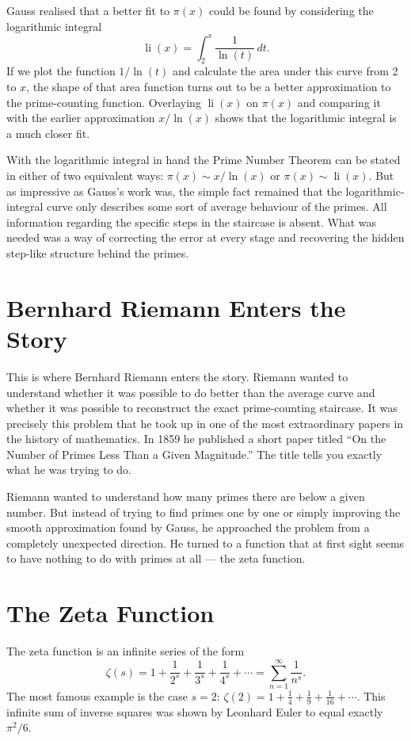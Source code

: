 \documentclass[11pt]{article}
\newcommand{\li}{\operatorname{li}}
\begin{document}
Gauss realised that a better fit to $\pi(x)$ could be found by considering the logarithmic integral
\[
\li(x) = \int_{2}^{x} \frac{1}{\ln(t)}\, dt.
\]
If we plot the function $1/\ln(t)$ and calculate the area under this curve from 2 to $x$, the shape of that area function turns out to be a better approximation to the prime-counting function. Overlaying $\li(x)$ on $\pi(x)$ and comparing it with the earlier approximation $x/\ln(x)$ shows that the logarithmic integral is a much closer fit.

With the logarithmic integral in hand the Prime Number Theorem can be stated in either of two equivalent ways: $\pi(x) \sim x/\ln(x)$ or $\pi(x) \sim \li(x)$. But as impressive as Gauss's work was, the simple fact remained that the logarithmic-integral curve only describes some sort of average behaviour of the primes. All information regarding the specific steps in the staircase is absent. What was needed was a way of correcting the error at every stage and recovering the hidden step-like structure behind the primes.

\section{Bernhard Riemann Enters the Story}

This is where Bernhard Riemann enters the story. Riemann wanted to understand whether it was possible to do better than the average curve and whether it was possible to reconstruct the exact prime-counting staircase. It was precisely this problem that he took up in one of the most extraordinary papers in the history of mathematics. In 1859 he published a short paper titled ``On the Number of Primes Less Than a Given Magnitude.'' The title tells you exactly what he was trying to do.

Riemann wanted to understand how many primes there are below a given number. But instead of trying to find primes one by one or simply improving the smooth approximation found by Gauss, he approached the problem from a completely unexpected direction. He turned to a function that at first sight seems to have nothing to do with primes at all --- the zeta function.

\section{The Zeta Function}

The zeta function is an infinite series of the form
\[
\zeta(s) = 1 + \frac{1}{2^s} + \frac{1}{3^s} + \frac{1}{4^s} + \cdots = \sum_{n=1}^{\infty} \frac{1}{n^s}.
\]
The most famous example is the case $s = 2$: $\zeta(2) = 1 + \tfrac{1}{4} + \tfrac{1}{9} + \tfrac{1}{16} + \cdots$. This infinite sum of inverse squares was shown by Leonhard Euler to equal exactly $\pi^2/6$.
\end{document}
